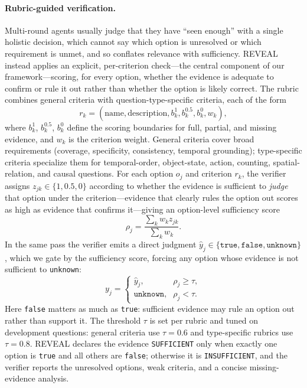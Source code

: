 \documentclass[letterpaper]{article} %
\begin{document}
\paragraph{Rubric-guided verification.}
Multi-round agents usually judge that they have ``seen enough'' with a single holistic decision, which cannot say which option is unresolved or which requirement is unmet, and so conflates relevance with sufficiency. REVEAL instead applies an explicit, per-criterion check---the central component of our framework---scoring, for every option, whether the evidence is adequate to confirm or rule it out rather than whether the option is likely correct. The rubric combines general criteria with question-type-specific criteria, each of the form
\begin{equation}
    r_k=(\mathrm{name},\mathrm{description},b_k^1,b_k^{0.5},b_k^0,w_k),
\end{equation}
where $b_k^1$, $b_k^{0.5}$, $b_k^0$ define the scoring boundaries for full, partial, and missing evidence, and $w_k$ is the criterion weight. General criteria cover broad requirements (coverage, specificity, consistency, temporal grounding); type-specific criteria specialize them for temporal-order, object-state, action, counting, spatial-relation, and causal questions. For each option $o_j$ and criterion $r_k$, the verifier assigns $z_{jk}\in\{1,0.5,0\}$ according to whether the evidence is sufficient to \emph{judge} that option under the criterion---evidence that clearly rules the option out scores as high as evidence that confirms it---giving an option-level sufficiency score
\begin{equation}
    \rho_j=\frac{\sum_k w_k z_{jk}}{\sum_k w_k}.
\end{equation}
In the same pass the verifier emits a direct judgment $\hat{y}_j\in\{\texttt{true},\texttt{false},\texttt{unknown}\}$, which we gate by the sufficiency score, forcing any option whose evidence is not sufficient to \texttt{unknown}:
\begin{equation}
    y_j=\begin{cases}
    \hat{y}_j,     & \rho_j\ge\tau,\\
    \texttt{unknown}, & \rho_j<\tau.
    \end{cases}
\end{equation}
Here \texttt{false} matters as much as \texttt{true}: sufficient evidence may rule an option out rather than support it. The threshold $\tau$ is set per rubric and tuned on development questions: general criteria use $\tau=0.6$ and type-specific rubrics use $\tau=0.8$. REVEAL declares the evidence \texttt{SUFFICIENT} only when exactly one option is \texttt{true} and all others are \texttt{false}; otherwise it is \texttt{INSUFFICIENT}, and the verifier reports the unresolved options, weak criteria, and a concise missing-evidence analysis.
\end{document}
